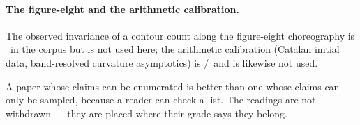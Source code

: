 \paragraph{The figure-eight and the arithmetic calibration.} The observed invariance of a contour
count along the figure-eight choreography is \V\ in the corpus but is not used here; the arithmetic
calibration (Catalan initial data, band-resolved curvature asymptotics) is \Cc/\V\ and is likewise
not used.

\begin{remark}
A paper whose claims can be enumerated is better than one whose claims can only be sampled,
because a reader can check a list. The readings are not withdrawn --- they are placed where
their grade says they belong.
\end{remark}
